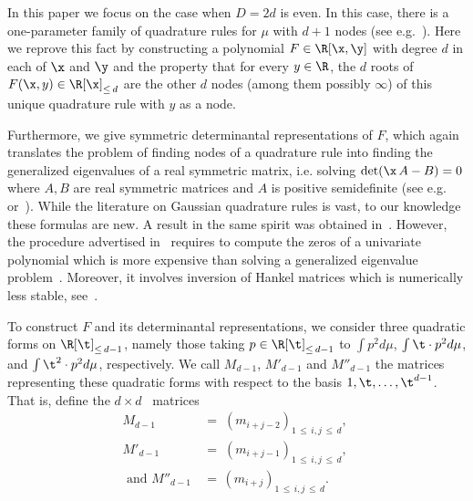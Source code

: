 In this paper we focus on the case when $D=2d$ is even. In this case, there is a one-parameter family of quadrature rules for $\mu$ with $d+1$ nodes (see e.g.~\cite[Theorem~9.7]{sch}). Here we reprove this fact by constructing a polynomial $F\in \R[\x,\y]$ with degree $d$ in each of $\x$ and $\y$ and the property that for every $y\in \R$, the $d$ roots of $F(\x,y)\in \R[\x]_{ \leq\,d}$ are the other $d$ nodes (among them possibly $\infty$) of this unique quadrature rule with $y$ as a node.

Furthermore, we give symmetric determinantal representations of $F$, which again translates the problem of finding nodes of a quadrature rule into finding the generalized eigenvalues of a real symmetric matrix,
i.e. solving $\det(\x\,A-B)=0$ where $A,B$ are real symmetric matrices and $A$ is positive semidefinite (see e.g.~\cite[Chapter~4]{eig} or~\cite{golub}). While the literature on Gaussian quadrature rules is vast, to our knowledge these formulas are new. A result in the same spirit was obtained in~\cite[Proposition~3.3]{curto}. However, the procedure advertised in~\cite[Theorem~3.10$\MK$(ii)]{curto} requires to compute the zeros of a univariate polynomial which is more expensive than solving a generalized eigenvalue problem~\cite[p.~1225]{golub}. Moreover, it involves inversion of Hankel matrices which is numerically less stable, see~\cite{illhankel}.


To construct $F$ and its determinantal representations, we consider three quadratic forms on $\R[\t]_{\leq\,d-1}$, namely those taking $p\in \R[\t]_{\leq\,d-1}$ to $\int p^2d\mu$, $\int \t \cdot p^2d\mu$, and $\int \t^2 \cdot p^2d\mu$, respectively. We call $M_{d-1}$, $M'_{d-1}$ and $M''_{d-1}$ the matrices representing these quadratic forms with respect to the basis $1,\t,\hdots, \t^{d-1}$. That is, define the $d\times d$ ~matrices
\begin{equation}\label{eq:matrices}
\begin{aligned}
M_{d-1}\; &= \; (m_{i+j-2})_{1\,\leq\,i,j\, \leq\,d}, \\
M'_{d-1} \; &= \; (m_{i+j-1})_{1\,\leq\,i,j\, \leq\,d}, \; \\ 
\text{ and } M''_{d-1} \,& = \, (m_{i+j})_{1\,\leq\,i,j\,\leq\,d}.
\end{aligned}
\end{equation}

